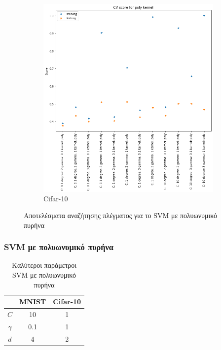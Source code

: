 \documentclass{beamer}
\begin{document}
\begin{frame}
\begin{figure}[H]
\begin{subfigure}[t]{0.45\linewidth}
    \includegraphics[width=\linewidth]{figures/cifar/cv_results_poly.png}
    \caption{Cifar-10}
    \end{subfigure}

    \caption{Αποτελέσματα αναζήτησης πλέγματος για το SVM με πολυωνυμικό
    πυρήνα}
    \label{fig:cv_poly}
\end{figure}

\end{frame}

\begin{frame}
\frametitle{SVM με πολυωνυμικό πυρήνα}

\begin{table}[h]
\centering
\begin{tabular}{|c|c|c|}
\hline
         & MNIST & Cifar-10 \\ \hline
$C$      & 10    & 1        \\ \hline
$\gamma$ & 0.1   & 1        \\ \hline
$d$      & 4     & 2        \\ \hline
\end{tabular}
\caption{Καλύτεροι παράμετροι SVM με πολυωνυμικό πυρήνα}
\label{tab:best_poly}
\end{table}

\end{frame}
\end{document}
